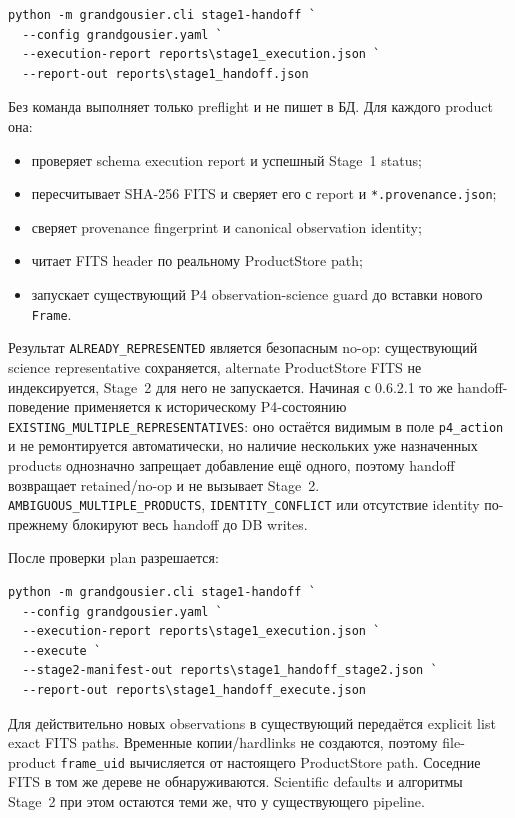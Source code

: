\begin{lstlisting}
python -m grandgousier.cli stage1-handoff `
  --config grandgousier.yaml `
  --execution-report reports\stage1_execution.json `
  --report-out reports\stage1_handoff.json
\end{lstlisting}

Без  команда выполняет только preflight и не пишет в БД. Для каждого product она:

\begin{itemize}
  \item проверяет schema execution report и успешный Stage~1 status;
  \item пересчитывает SHA-256 FITS и сверяет его с report и \texttt{*.provenance.json};
  \item сверяет provenance fingerprint и canonical observation identity;
  \item читает FITS header по реальному ProductStore path;
  \item запускает существующий P4 observation-science guard до вставки нового \texttt{Frame}.
\end{itemize}

Результат \texttt{ALREADY\_REPRESENTED} является безопасным no-op: существующий science representative сохраняется, alternate ProductStore FITS не индексируется, Stage~2 для него не запускается. Начиная с 0.6.2.1 то же handoff-поведение применяется к историческому P4-состоянию \texttt{EXISTING\_MULTIPLE\_REPRESENTATIVES}: оно остаётся видимым в поле \texttt{p4\_action} и не ремонтируется автоматически, но наличие нескольких уже назначенных products однозначно запрещает добавление ещё одного, поэтому handoff возвращает retained/no-op и не вызывает Stage~2. \texttt{AMBIGUOUS\_MULTIPLE\_PRODUCTS}, \texttt{IDENTITY\_CONFLICT} или отсутствие identity по-прежнему блокируют весь handoff до DB writes.

После проверки plan разрешается:

\begin{lstlisting}
python -m grandgousier.cli stage1-handoff `
  --config grandgousier.yaml `
  --execution-report reports\stage1_execution.json `
  --execute `
  --stage2-manifest-out reports\stage1_handoff_stage2.json `
  --report-out reports\stage1_handoff_execute.json
\end{lstlisting}

Для действительно новых observations в существующий  передаётся explicit list exact FITS paths. Временные копии/hardlinks не создаются, поэтому file-product \texttt{frame\_uid} вычисляется от настоящего ProductStore path. Соседние FITS в том же дереве не обнаруживаются. Scientific defaults и алгоритмы Stage~2 при этом остаются теми же, что у существующего pipeline.

